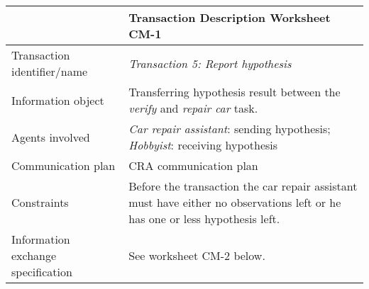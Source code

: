 \noindent
\begin{tabular}{|>{\colleft}p{3cm}|>{\colleft}p{8.5cm}|}
\hline
{\bf Communication model} &
   {\bf Transaction Description Worksheet CM-1} \\
\hline
\hline
\sc Transaction identifier/name &
	\emph{Transaction 5: Report hypothesis} \\

\hline
\sc Information object &
	Transferring hypothesis result between the \emph{verify} and \emph{repair car} task. \\
\hline
\sc Agents involved &
	\emph{Car repair assistant}: sending hypothesis;	\newline
	\emph{Hobbyist}: receiving hypothesis			\\
\hline
\sc Communication plan &
	CRA communication plan\\

\hline
\sc Constraints &
	Before the transaction the car repair assistant must have either no observations left or he has one or less hypothesis left.\\
\hline
\sc Information exchange specification &
	See worksheet CM-2 below.\\

\hline
\end{tabular}